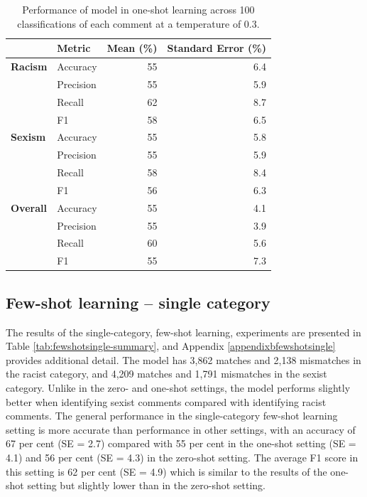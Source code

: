 \documentclass[12pt,]{article}
\begin{document}
\begin{table}

\caption{\label{tab:oneshot-summary}Performance of model in one-shot learning across 100 classifications of each comment at a temperature of 0.3.}
\centering
\begin{tabular}[t]{>{}llrr}
\toprule
 & Metric & Mean (\%) & Standard Error (\%)\\
\midrule
\textbf{Racism} & Accuracy & 55 & 6.4\\
\textbf{} & Precision & 55 & \vphantom{1} 5.9\\
\textbf{} & Recall & 62 & 8.7\\
\textbf{} & F1 & 58 & 6.5\\
\textbf{Sexism} & Accuracy & 55 & 5.8\\
\textbf{} & Precision & 55 & 5.9\\
\textbf{} & Recall & 58 & 8.4\\
\textbf{} & F1 & 56 & 6.3\\
\textbf{Overall} & Accuracy & 55 & 4.1\\
\textbf{} & Precision & 55 & 3.9\\
\textbf{} & Recall & 60 & 5.6\\
\textbf{} & F1 & 55 & 7.3\\
\bottomrule
\end{tabular}
\end{table}

\hypertarget{few-shot-learning-single-category}{%
\subsection{Few-shot learning -- single category}\label{few-shot-learning-single-category}}

The results of the single-category, few-shot learning, experiments are presented in Table \ref{tab:fewshotsingle-summary}, and Appendix \ref{appendixbfewshotsingle} provides additional detail. The model has 3,862 matches and 2,138 mismatches in the racist category, and 4,209 matches and 1,791 mismatches in the sexist category. Unlike in the zero- and one-shot settings, the model performs slightly better when identifying sexist comments compared with identifying racist comments. The general performance in the single-category few-shot learning setting is more accurate than performance in other settings, with an accuracy of 67 per cent (SE = 2.7) compared with 55 per cent in the one-shot setting (SE = 4.1) and 56 per cent (SE = 4.3) in the zero-shot setting. The average F1 score in this setting is 62 per cent (SE = 4.9) which is similar to the results of the one-shot setting but slightly lower than in the zero-shot setting.
\end{document}
